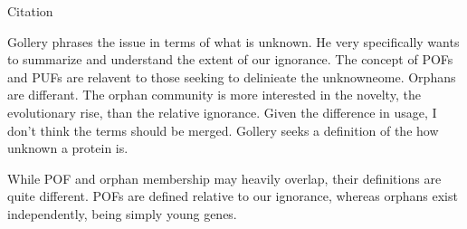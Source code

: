     Citation \cite{gollery_pofs:_2007}

    Gollery phrases the issue in terms of what is unknown. He very
    specifically wants to summarize and understand the extent of our
    ignorance. The concept of POFs and PUFs are relavent to those seeking
    to delinieate the unknowneome. Orphans are differant. The orphan
    community is more interested in the novelty, the evolutionary rise,
    than the relative ignorance. Given the difference in usage, I don't
    think the terms should be merged. Gollery seeks a definition of the how
    unknown a protein is.

    While POF and orphan membership may heavily overlap, their definitions
    are quite different. POFs are defined relative to our ignorance,
    whereas orphans exist independently, being simply young genes.

